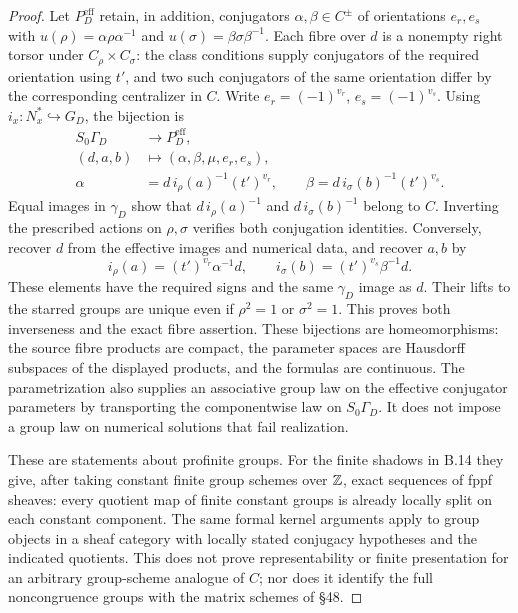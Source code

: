 \begin{proof}
Let $P_D^{\mathrm{eff}}$ retain, in addition, conjugators
$\alpha,\beta\in C^{\pm}$ of orientations $e_r,e_s$ with
$u(\rho)=\alpha\rho\alpha^{-1}$ and
$u(\sigma)=\beta\sigma\beta^{-1}$.
Each fibre over $d$ is a nonempty right torsor under
$C_\rho\times C_\sigma$: the class conditions supply conjugators
of the required orientation using $t'$, and two such conjugators
of the same orientation differ by the corresponding centralizer
in $C$. Write $e_r=(-1)^{v_r}$, $e_s=(-1)^{v_s}$.
Using $i_x:N_x^*\hookrightarrow G_D$, the bijection is
\[
\begin{aligned}
 S_0\Gamma_D&\longrightarrow P_D^{\mathrm{eff}},\\
 (d,a,b)&\longmapsto(\alpha,\beta,\mu,e_r,e_s),\\
 \alpha&=d\,i_\rho(a)^{-1}(t')^{v_r},\qquad
 \beta=d\,i_\sigma(b)^{-1}(t')^{v_s}.
\end{aligned}
\tag{B.13.11}
\]
Equal images in $\gamma_D$ show that $d\,i_\rho(a)^{-1}$ and
$d\,i_\sigma(b)^{-1}$ belong to $C$. Inverting the prescribed
actions on $\rho,\sigma$ verifies both conjugation identities.
Conversely, recover $d$ from the effective images and numerical
data, and recover $a,b$ by
\[
 i_\rho(a)=(t')^{v_r}\alpha^{-1}d,\qquad
 i_\sigma(b)=(t')^{v_s}\beta^{-1}d.
                                                        \tag{B.13.12}
\]
These elements have the required signs and the same $\gamma_D$
image as $d$. Their lifts to the starred groups are unique even
if $\rho^2=1$ or $\sigma^2=1$. This proves both inverseness and
the exact fibre assertion. These bijections are homeomorphisms:
the source fibre products are compact, the parameter spaces are
Hausdorff subspaces of the displayed products, and the formulas
are continuous. The parametrization also supplies an associative group
law on the effective conjugator parameters by transporting the
componentwise law on $S_0\Gamma_D$. It does not impose a group law
on numerical solutions that fail realization.

These are statements about profinite groups. For the finite shadows
in B.14 they give, after taking constant finite group schemes over
$\mathbb Z$, exact sequences of fppf sheaves: every quotient map of finite
constant groups is already locally split on each constant component.
The same formal kernel arguments apply to group objects in a sheaf
category with locally stated conjugacy hypotheses and the indicated
quotients. This does not prove representability or finite presentation
for an arbitrary group-scheme analogue of $C$; nor does it identify
the full noncongruence groups with the matrix schemes of \S48.
\end{proof}

